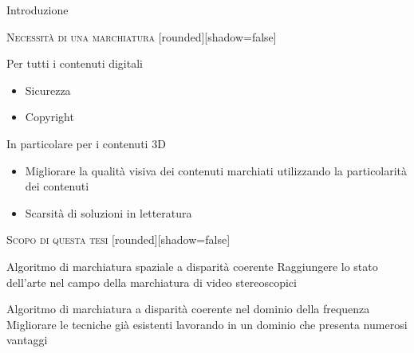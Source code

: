 \documentclass{beamer}
\begin{document}
\begin{section}{Introduzione}
\begin{frame}[t]{\textsc{Necessit\`{a} di una marchiatura}}
[rounded][shadow=false]
\begin{center}
\begin{block}{Per tutti i contenuti digitali}
\begin{itemize}
\item  Sicurezza
\item  Copyright
\end{itemize}
\end{block}
\vspace{1em}
\begin{block}{In particolare per i contenuti 3D}
\begin{itemize}
\item Migliorare la qualit\`{a} visiva dei contenuti marchiati utilizzando la particolarit\`{a} dei contenuti
\item Scarsit\`{a} di soluzioni in letteratura
\end{itemize}
\end{block}
\end{center}
\end{frame}


\begin{frame}[t]{\textsc{Scopo di questa tesi}}
	[rounded][shadow=false]
\begin{center}
\begin{block}{Algoritmo di marchiatura spaziale a disparit\`{a} coerente}
Raggiungere lo stato dell'arte nel campo della marchiatura di video stereoscopici
\end{block}
\vspace{1em}
\begin{block}{Algoritmo di marchiatura a disparit\`{a} coerente nel dominio della frequenza}
Migliorare le tecniche gi\`{a} esistenti lavorando in un dominio che presenta numerosi vantaggi

\end{block}
\end{center}
\end{frame}

\end{section}
\end{document}
